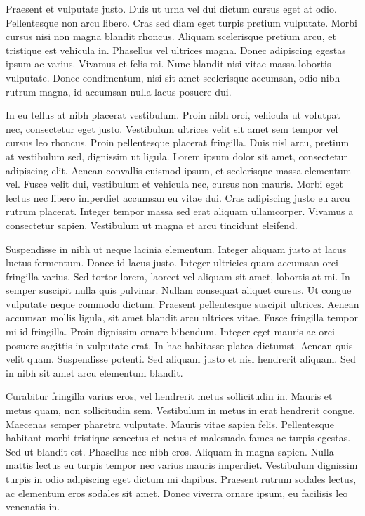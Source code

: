 Praesent et vulputate justo.
Duis ut urna vel dui dictum cursus eget at odio.
Pellentesque non arcu libero.
Cras sed diam eget turpis pretium vulputate.
Morbi cursus nisi non magna blandit rhoncus.
Aliquam scelerisque pretium arcu, et tristique est vehicula in.
Phasellus vel ultrices magna.
Donec adipiscing egestas ipsum ac varius.
Vivamus et felis mi.
Nunc blandit nisi vitae massa lobortis vulputate.
Donec condimentum, nisi sit amet scelerisque accumsan, odio nibh rutrum magna, id accumsan nulla lacus posuere dui.

In eu tellus at nibh placerat vestibulum.
Proin nibh orci, vehicula ut volutpat nec, consectetur eget justo.
Vestibulum ultrices velit sit amet sem tempor vel cursus leo rhoncus.
Proin pellentesque placerat fringilla.
Duis nisl arcu, pretium at vestibulum sed, dignissim ut ligula.
Lorem ipsum dolor sit amet, consectetur adipiscing elit.
Aenean convallis euismod ipsum, et scelerisque massa elementum vel.
Fusce velit dui, vestibulum et vehicula nec, cursus non mauris.
Morbi eget lectus nec libero imperdiet accumsan eu vitae dui.
Cras adipiscing justo eu arcu rutrum placerat.
Integer tempor massa sed erat aliquam ullamcorper.
Vivamus a consectetur sapien.
Vestibulum ut magna et arcu tincidunt eleifend.

Suspendisse in nibh ut neque lacinia elementum.
Integer aliquam justo at lacus luctus fermentum.
Donec id lacus justo.
Integer ultricies quam accumsan orci fringilla varius.
Sed tortor lorem, laoreet vel aliquam sit amet, lobortis at mi.
In semper suscipit nulla quis pulvinar.
Nullam consequat aliquet cursus.
Ut congue vulputate neque commodo dictum.
Praesent pellentesque suscipit ultrices.
Aenean accumsan mollis ligula, sit amet blandit arcu ultrices vitae.
Fusce fringilla tempor mi id fringilla.
Proin dignissim ornare bibendum.
Integer eget mauris ac orci posuere sagittis in vulputate erat.
In hac habitasse platea dictumst.
Aenean quis velit quam.
Suspendisse potenti.
Sed aliquam justo et nisl hendrerit aliquam.
Sed in nibh sit amet arcu elementum blandit.

Curabitur fringilla varius eros, vel hendrerit metus sollicitudin in.
Mauris et metus quam, non sollicitudin sem.
Vestibulum in metus in erat hendrerit congue.
Maecenas semper pharetra vulputate.
Mauris vitae sapien felis.
Pellentesque habitant morbi tristique senectus et netus et malesuada fames ac turpis egestas.
Sed ut blandit est.
Phasellus nec nibh eros.
Aliquam in magna sapien.
Nulla mattis lectus eu turpis tempor nec varius mauris imperdiet.
Vestibulum dignissim turpis in odio adipiscing eget dictum mi dapibus.
Praesent rutrum sodales lectus, ac elementum eros sodales sit amet.
Donec viverra ornare ipsum, eu facilisis leo venenatis in.


